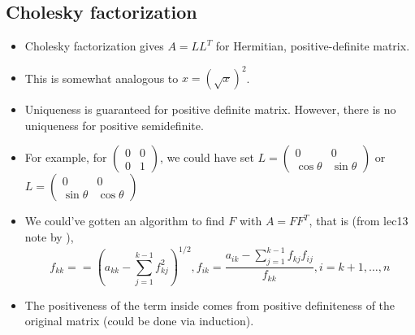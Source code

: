 \documentclass[11pt,reqno]{amsart}
\theoremstyle{remark}
\begin{document}
\subsection{Cholesky factorization}
\begin{itemize}
\item Cholesky factorization gives $A=LL^T$ for Hermitian, positive-definite matrix.
\item This is somewhat analogous to $x=(\sqrt x)^2$.
\item Uniqueness is guaranteed for positive definite matrix. However, there is no uniqueness for positive semidefinite.
\item For example, for $
\begin{pmatrix}
0 & 0 \\ 0 & 1
\end{pmatrix}$, we could have set $L=\begin{pmatrix}
  0 & 0 \\ \cos\theta & \sin\theta
\end{pmatrix}
  $ or $L=\begin{pmatrix}
    0 & 0 \\ \sin\theta & \cos\theta
  \end{pmatrix}$
\item We could've gotten an algorithm to find $F$ with $A=FF^T$, that is (from lec13 note by ), 
$$
f_{kk}==(a_{kk}-\sum^{k-1}_{j=1}f^2_{kj})^{1/2}, f_{ik}=\frac{a_{ik}-\sum^{k-1}_{j=1}f_{kj}f_{ij}}{f_{kk}},i=k+1,\dots,n
$$
\item The positiveness of the term inside comes from positive definiteness of the original matrix (could be done via induction).
\end{itemize}
\end{document}
